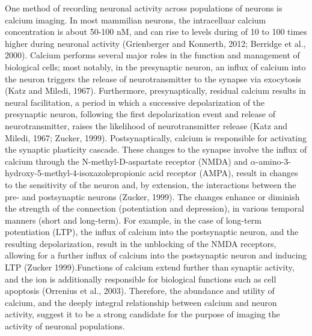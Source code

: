 \documentclass[11pt,titlepage]{article}
\begin{document}
One method of recording neuronal activity across populations of neurons is calcium imaging. In most mammilian neurons, the intracelluar calcium concentration is about 50-100 nM, and can rise to levels during of 10 to 100 times higher during neuronal activity (Grienberger and Konnerth, 2012; Berridge et al., 2000). Calcium performs several major roles in the function and management of biological cells; most notably, in the presynaptic neuron, an influx of calcium into the neuron triggers the release of neurotransmitter to the synapse via exocytosis (Katz and Miledi, 1967). Furthermore, presynaptically, residual calcium results in neural facilitation, a period in which a successive depolarization of the presynaptic neuron, following the first depolarization event and release of neurotransmitter, raises the likelihood of neurotransmitter release (Katz and Miledi, 1967; Zucker, 1999). Postsynaptically, calcium is responsible for activating the synaptic plasticity cascade. These changes to the synapse involve the influx of calcium through the N-methyl-D-aspartate receptor (NMDA) and $\alpha$-amino-3-hydroxy-5-methyl-4-isoxazolepropionic acid receptor (AMPA), result in changes to the sensitivity of the neuron and, by extension, the interactions between the pre- and postsynaptic neurons (Zucker, 1999). The changes enhance or diminish the strength of the connection (potentiation and depression), in various temporal manners (short and long-term). For example, in the case of long-term potentiation (LTP), the influx of calcium into the postsynaptic neuron, and the resulting depolarization, result in the unblocking of the NMDA receptors, allowing for a further influx of calcium into the postsynaptic neuron and inducing LTP (Zucker 1999).Functions of calcium extend further than synaptic activity, and the ion is additionally responsible for biological functions such as cell apoptosis (Orrenius et al., 2003). Therefore, the abundance and utility of calcium, and the deeply integral relationship between calcium and neuron activity, suggest it to be a strong candidate for the purpose of imaging the activity of neuronal populations.\par
\end{document}
